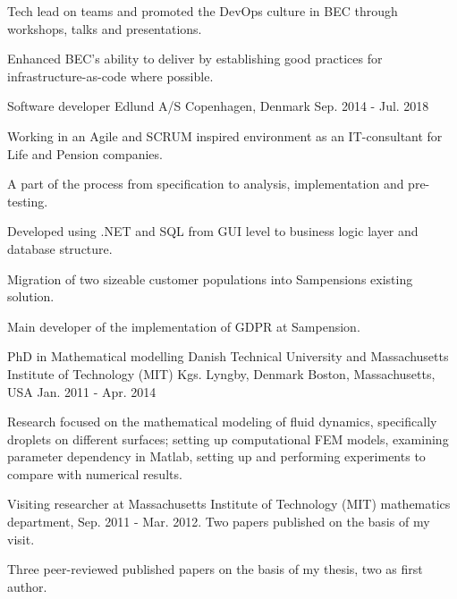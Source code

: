 \begin{cventries}
{\begin{cvitems}
\item Tech lead on teams and promoted the DevOps culture in BEC through workshops, talks and presentations.
\item Enhanced BEC's ability to deliver by establishing good practices for infrastructure-as-code where possible.
\end{cvitems}
}
\cventry
{Software developer} %
{Edlund A/S} %
{Copenhagen, Denmark} %
{Sep. 2014 - Jul. 2018 } %
{ %
\begin{cvitems}
\item {Working in an Agile and SCRUM inspired environment as an IT-consultant for Life and Pension companies.}
\item {A part of the process from specification to analysis, implementation and pre-testing.}
\item {Developed using .NET and SQL from GUI level to business logic layer and database structure.}
\item {Migration of two sizeable customer populations into Sampensions existing solution.}
\item {Main developer of the implementation of GDPR at Sampension.}
\end{cvitems}
}

\cventry
{PhD in Mathematical modelling} %
{Danish Technical University and Massachusetts Institute of Technology (MIT)} %
{Kgs. Lyngby, Denmark \newline Boston, Massachusetts, USA} %
{Jan. 2011 - Apr. 2014} %
{ %
\begin{cvitems}
\item {Research focused on the mathematical modeling of fluid dynamics, specifically droplets on different surfaces; setting up computational FEM models, examining parameter dependency in Matlab, setting up and performing experiments to compare with numerical results.}
\item Visiting researcher at Massachusetts Institute of Technology (MIT) mathematics department, Sep. 2011 - Mar. 2012. Two papers published on the basis of my visit.
\item Three peer-reviewed published papers on the basis of my thesis, two as first author.
\end{cvitems}
}
\end{cventries}
